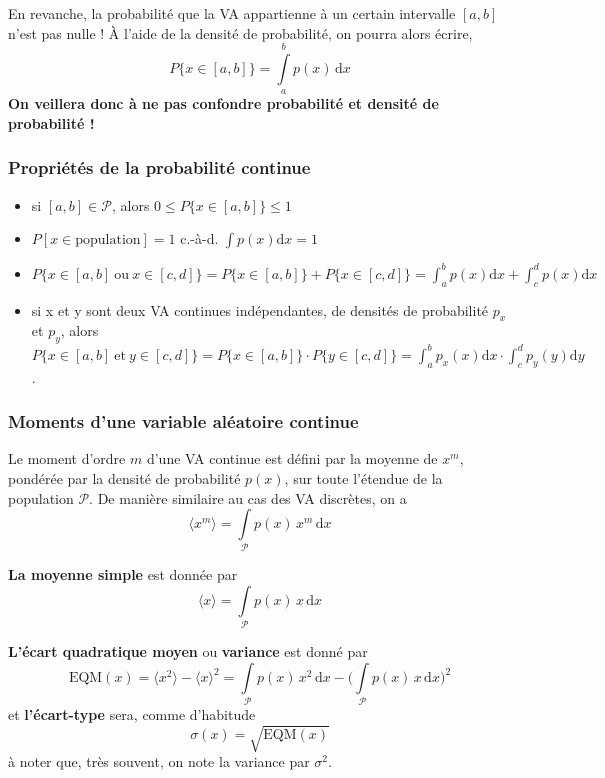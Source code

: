 \documentclass[main.tex]{subfiles}
\begin{document}
En revanche, la probabilité que la VA appartienne à un certain intervalle $[a,b]$ n'est pas nulle ! À l'aide de la densité de probabilité, on pourra alors écrire,
\begin{equation}
    P\{x\in[a,b]\}=\int\limits_{a}^{b}p(x)\,\text{d}x
\end{equation}
\textbf{On veillera donc à ne pas confondre probabilité et densité de probabilité !}

\subsubsection{Propriétés de la probabilité continue}

\begin{itemize}
    \item si $[a,b]\in\mathcal{P}$, alors $0\le P\{x\in[a,b]\}\le 1$
    \item $P[x\in\text{population}]=1$ c.-à-d. $\int p(x)\text{d}x=1$
    \item $P\{x\in[a,b]\ \text{ou}\ x\in[c,d]\}=P\{x\in[a,b]\}+P\{x\in[c,d]\}=\int_{a}^{b} p(x)\text{d}x+\int_{c}^{d} p(x)\text{d}x$
    \item si x et y sont deux VA continues indépendantes, de densités de probabilité $p_x$ et $p_y$, alors $P\{x\!\in\![a,b]\ \text{et}\ y\!\in\![c,d]\}=P\{x\!\in\![a,b]\}\cdot P\{y\!\in\![c,d]\}=\int_{a}^{b} p_x(x)\text{d}x\cdot\!\int_{c}^{d} p_y(y)\text{d}y$.
\end{itemize}

\subsubsection{Moments d'une variable aléatoire continue}\label{par:mdvac}

Le moment d'ordre $m$ d'une VA continue est défini par la moyenne de $x^m$, pondérée par la densité de probabilité $p(x)$, sur toute l'étendue de la population $\mathcal{P}$. De manière similaire au cas des VA discrètes, on a
\begin{equation}
    \langle x^m\rangle=\int\limits_{\mathcal{P}}p(x)\,x^m\,\text{d}x
    \label{eq:mdvac}
\end{equation}

\textbf{La moyenne simple} est donnée par
\begin{equation}
    \langle x\rangle=\int\limits_{\mathcal{P}}p(x)\,x\,\text{d}x
\end{equation}

\textbf{L'écart quadratique moyen} ou \textbf{variance} est donné par
\begin{equation}
    \text{EQM}(x)=\langle x^2\rangle-\langle x\rangle^2=\int\limits_{\mathcal{P}}p(x)\,x^2\,\text{d}x-\Big(\int\limits_{\mathcal{P}}p(x)\,x\,\text{d}x\Big)^2
\end{equation}
et \textbf{l'écart-type} sera, comme d'habitude
\begin{equation}
    \sigma(x)=\sqrt{\text{EQM}(x)}
\end{equation}
à noter que, très souvent, on note la variance par $\sigma^2$.
\end{document}
